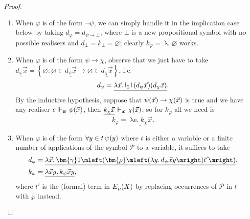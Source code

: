 \documentclass[12pt,openany]{book}
\theoremstyle{plain}
\theoremstyle{definition}
\newcommand\uplabel[1]{\textup{(#1)}}
\newcommand\opA[1]{\mathop{\forall #1}}
\newcommand\oplam[1]{\mathop{\lambda #1.}}
\newcommand\Pow{\mathcal{P}}
\newcommand\bi{\mathbf{i}}
\begin{document}
\begin{proof}
\begin{enumerate}[label=\uplabel{\arabic*}]
    \item When $\varphi$ is of the form $\neg \psi$, we can simply handle it in the implication case below by taking $d_\varphi = d_{\psi \rightarrow \bot}$, where $\bot$ is a new propositional symbol with no possible realisers and $d_\bot = k_\bot = \varnothing$; clearly $k_\varphi = \underline{\oplam{\vec{x}} \varnothing}$ works.

    \item When $\varphi$ is of the form $\psi \rightarrow \chi$, observe that we just have to take $\underline{d_\varphi \vec{x}} = \left\{\varnothing : \varnothing \in \underline{d_\psi \vec{x}} \rightarrow \varnothing \in \underline{d_\chi \vec{x}}\right\}$, i.e.
          \[d_\varphi = \underline{\oplam{\vec{x}} \bi_2 1 \mleft(d_\psi \vec{x}\mright) \mleft(d_\chi \vec{x}\mright)}.\]
          By the inductive hypothesis, suppose that $\psi\mleft(\vec{x}\mright) \rightarrow \chi\mleft(\vec{x}\mright)$ is true and we have any realiser $e \Vdash_\mathfrak{w} \psi\mleft(\vec{x}\mright)$, then $\underline{k_\chi \vec{x}} \Vdash_\mathfrak{w} \chi\mleft(\vec{x}\mright)$; so for $k_\varphi$ all we need is
          \[k_\varphi = \underline{\oplam{\vec{x} e} k_\chi \vec{x}}.\]

    \item When $\varphi$ is of the form $\opA{y \in t} \psi\mleft(y\mright)$ where $t$ is either a variable or a finite number of applications of the symbol $\Pow$ to a variable, it suffices to take
          \begin{align*}
            d_\varphi & = \underline{\oplam{\vec{x}} \bm{\gamma} 1 \mleft(\bm{\rho} \mleft(\oplam{y} d_\psi \vec{x} y\mright) t'\mright)}, \\
            k_\varphi & = \underline{\oplam{\vec{x} y} k_\psi \vec{x} y},
          \end{align*}
          where $t'$ is the (formal) term in $E_\wp\mleft(X\mright)$ by replacing occurrences of $\Pow$ in $t$ with $\bar{\wp}$ instead.


\end{enumerate}
\end{proof}
\end{document}
